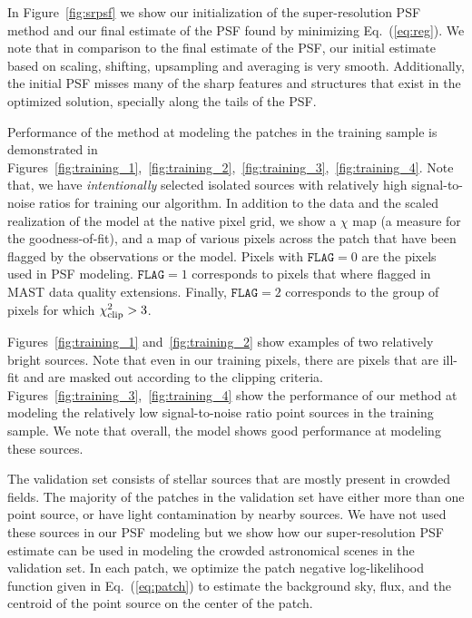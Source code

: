 In Figure~\ref{fig:srpsf} we show our initialization of the super-resolution PSF method and our final estimate of the PSF found by
minimizing Eq.~(\ref{eq:reg}). We note that in comparison to the final estimate of the PSF, our initial estimate based on scaling, shifting, 
upsampling and averaging is very smooth. Additionally, the initial PSF misses many of the sharp features and structures that exist in the optimized solution, specially along the tails of the PSF.

Performance of the method at modeling the patches in the training sample is demonstrated in Figures~\ref{fig:training_1},~\ref{fig:training_2},~\ref{fig:training_3},~\ref{fig:training_4}. 
Note that, we have \emph{intentionally} selected isolated sources with relatively high signal-to-noise ratios for training our algorithm. In addition to the data and the scaled realization of the model at the native pixel grid, we show a $\chi$ map (a measure for the goodness-of-fit), and a map of various pixels across the patch that have been flagged by the observations or the model. Pixels with $\mathtt{FLAG}=0$ are the pixels used in PSF modeling. $\mathtt{FLAG}=1$ corresponds to pixels that where flagged in MAST data quality extensions. Finally, $\mathtt{FLAG}=2$ corresponds to the group of pixels for which $\chi^{2}_{\rm clip}>3$. 

Figures~\ref{fig:training_1} and~\ref{fig:training_2} show examples of two relatively bright sources. Note that even in our training pixels, there are pixels that are ill-fit and are masked out according to the clipping criteria. Figures~\ref{fig:training_3},~\ref{fig:training_4} show the performance of our method at modeling the relatively low signal-to-noise ratio point sources in the training sample. We note that overall, the model shows good performance at modeling these sources.

The validation set consists of stellar sources that are mostly present in crowded fields. The majority of the patches in the validation set have either more than 
one point source, or have light contamination by nearby sources. We have not used these sources in our PSF modeling but we show how our super-resolution PSF estimate 
can be used in modeling the crowded astronomical scenes in the validation set. In each patch, we optimize the patch negative log-likelihood function given in Eq.~(\ref{eq:patch}) to 
estimate the background sky, flux, and the centroid of the point source on the center of the patch. 

